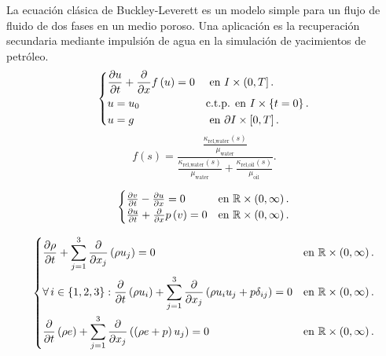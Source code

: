\begin{example}%
	La ecuación clásica de
	Buckley-Leverett
	es un modelo simple para un flujo de fluido de dos fases en un medio
	poroso.
	Una aplicación es la recuperación secundaria mediante impulsión de
	agua en la simulación de yacimientos de petróleo.
	\begin{equation}
		\begin{dcases}
			\diffp{u}{t}+
			\diffp{}{x}
			f\left(u\right)=0 &
			\text{ en }I\times\left(0,T\right].         \\
			u=u_{0}                       &
			\text{c.t.p. en }I\times\left\{t=0\right\}. \\
			u=g                           &
			\text{ en }\partial I\times\left[0,T\right].
		\end{dcases}
	\end{equation}
	\begin{equation*}
		f\left(s\right)=
		\frac{\frac{\kappa_{\text{rel,water}}\left(s\right)}{\mu_{\text{water}}}}{
			\frac{\kappa_{\text{rel,water}}\left(s\right)}{\mu_{\text{water}}}+
			\frac{\kappa_{\text{rel,oil}}\left(s\right)}{\mu_{\text{oil}}}
		}.
	\end{equation*}
\end{example}

\begin{example}[$p$-sistema]
	\begin{equation*}
		\begin{cases}
			\diffp{v}{t}-\diffp{u}{x}=0               &
			\text{en }\mathbb{R}\times\left(0,\infty\right). \\
			\diffp{u}{t}+\diffp{}{x}p\left(v\right)=0 &
			\text{en }\mathbb{R}\times\left(0,\infty\right).
		\end{cases}
	\end{equation*}
\end{example}


\begin{example}
	\begin{equation*}
		\begin{dcases}
			\diffp{\rho}{t}+
			\sum_{j=1}^{3}
			\diffp{}{x_{j}}
			\left(\rho u_{j}\right)=0                   &
			\text{en }\mathbb{R}\times\left(0,\infty\right). \\
			\forall i\in\left\{1,2,3\right\}:
			\diffp{}{t}
			\left(\rho u_{i}\right)+
			\sum_{j=1}^{3}
			\diffp{}{x_{j}}
			\left(\rho u_{i}u_{j}+p\delta_{ij}\right)=0 &
			\text{en }\mathbb{R}\times\left(0,\infty\right). \\
			\diffp{}{t}
			\left(\rho e\right)+
			\sum_{j=1}^{3}
			\diffp{}{x_{j}}
			\left(\left(\rho e+p\right)u_{j}\right)=0   &
			\text{en }\mathbb{R}\times\left(0,\infty\right).
		\end{dcases}
	\end{equation*}
\end{example}
